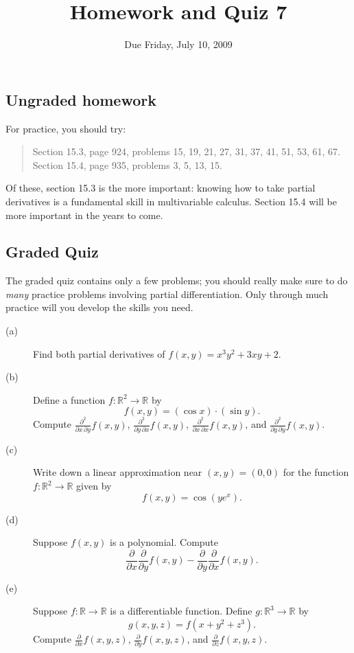 \documentclass[12pt]{article}
\title{Homework and Quiz 7}
\date{Due Friday, July 10, 2009}
\newcommand{\R}{\mathbb{R}}
\begin{document}
\maketitle

\subsection*{Ungraded homework}

For practice, you should try:
\begin{quote}
Section 15.3, page 924, problems 15, 19, 21, 27, 31, 37, 41, 51, 53, 61, 67. \\
Section 15.4, page 935, problems 3, 5, 13, 15.
\end{quote}
Of these, section 15.3 is the more important: knowing how to take
partial derivatives is a fundamental skill in multivariable calculus.
Section 15.4 will be more important in the years to come.

\vfill

\subsection*{Graded Quiz}

The graded quiz contains only a few problems; you should really make
sure to do \textit{many} practice problems involving partial
differentiation.  Only through much practice will you develop the
skills you need.

\begin{description}
\item[(a)] Find both partial derivatives of $f(x,y) = x^3 y^2 + 3xy + 2$.
\vfill
\item[(b)] Define a function $f : \R^2 \to \R$ by
$$
f(x,y) = \left( \cos x \right) \cdot \left( \sin y \right).
$$
Compute
$\displaystyle\frac{\partial^2}{\partial x\, \partial y} f(x,y)$,
$\displaystyle\frac{\partial^2}{\partial y\, \partial x} f(x,y)$,
$\displaystyle\frac{\partial^2}{\partial x\, \partial x} f(x,y)$, and
$\displaystyle\frac{\partial^2}{\partial y\, \partial y} f(x,y)$.
\vfill
\item[(c)] Write down a linear approximation near $(x,y) = (0,0)$ for the function $f : \R^2 \to \R$ given by
$$
f(x,y) = \cos \left( y e^{x} \right).
$$
\vfill
\item[(d)] Suppose $f(x,y)$ is a polynomial.  Compute
$$
\frac{\partial}{\partial x}
\frac{\partial}{\partial y} f(x,y) - 
\frac{\partial}{\partial y}
\frac{\partial}{\partial x} f(x,y).
$$
\vfill
\item[(e)] Suppose $f : \R \to \R$ is a differentiable function.  Define $g : \R^3 \to \R$ by
$$
g(x,y,z) = f(x + y^2 + z^3).
$$
Compute $\displaystyle\frac{\partial}{\partial x} f(x,y,z)$, $\displaystyle\frac{\partial}{\partial y} f(x,y,z)$, and $\displaystyle\frac{\partial}{\partial z} f(x,y,z)$.
\vfill
\end{description}
\end{document}
